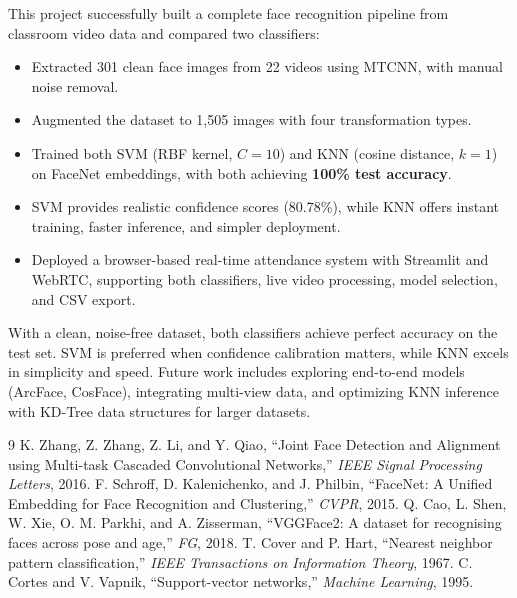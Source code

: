 \documentclass[12pt,a4paper]{article}
\begin{document}
This project successfully built a complete face recognition pipeline from classroom video data and compared two classifiers:

\begin{itemize}
    \item Extracted 301 clean face images from 22 videos using MTCNN, with manual noise removal.
    \item Augmented the dataset to 1,505 images with four transformation types.
    \item Trained both SVM (RBF kernel, $C=10$) and KNN (cosine distance, $k=1$) on FaceNet embeddings, with both achieving \textbf{100\% test accuracy}.
    \item SVM provides realistic confidence scores (80.78\%), while KNN offers instant training, faster inference, and simpler deployment.
    \item Deployed a browser-based real-time attendance system with Streamlit and WebRTC, supporting both classifiers, live video processing, model selection, and CSV export.
\end{itemize}

With a clean, noise-free dataset, both classifiers achieve perfect accuracy on the test set. SVM is preferred when confidence calibration matters, while KNN excels in simplicity and speed. Future work includes exploring end-to-end models (ArcFace, CosFace), integrating multi-view data, and optimizing KNN inference with KD-Tree data structures for larger datasets.

\newpage

\begin{thebibliography}{9}
 K. Zhang, Z. Zhang, Z. Li, and Y. Qiao, ``Joint Face Detection and Alignment using Multi-task Cascaded Convolutional Networks,'' \textit{IEEE Signal Processing Letters}, 2016.
 F. Schroff, D. Kalenichenko, and J. Philbin, ``FaceNet: A Unified Embedding for Face Recognition and Clustering,'' \textit{CVPR}, 2015.
 Q. Cao, L. Shen, W. Xie, O. M. Parkhi, and A. Zisserman, ``VGGFace2: A dataset for recognising faces across pose and age,'' \textit{FG}, 2018.
 T. Cover and P. Hart, ``Nearest neighbor pattern classification,'' \textit{IEEE Transactions on Information Theory}, 1967.
 C. Cortes and V. Vapnik, ``Support-vector networks,'' \textit{Machine Learning}, 1995.
\end{thebibliography}
\end{document}
